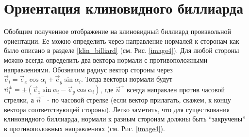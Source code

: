 \documentclass[a4paper]{article}
\begin{document}
%
%
%

\section{Ориентация клиновидного биллиарда}

Обобщим полученное отображение на клиновидный биллиард произвольной ориентации. Ее можно определить через направление нормалей к сторонам как было описано в разделе \ref{klin_billiard} (см. Рис. \ref{image4}). Для любой стороны можно всегда определить два вектора нормали с противоположными направлениями. Обозначим радиус вектор стороны через $\vec{e}_{i} = \vec{e}_{x}\cos \alpha_i +\vec{e}_{y} \sin\alpha_i $. Тогда векторы нормали будут $\overset{\rightharpoonup }{n}_i^{\pm } = \pm(\vec{e}_{x}\sin \alpha_i -\vec{e}_{y} \cos\alpha_i)$, где $\vec{n}^+$ всегда направлен против часовой стрелки, а $\vec{n}^-$ - по часовой стрелке (если вектор прилагать, скажем, к концу вектора соответствующей стороны). Легко заметить, что для существования клиновидного биллиарда, нормали к разным сторонам должны быть ``закручены'' в противоположных направлениях (см. Рис. \ref{image4}).
\end{document}
